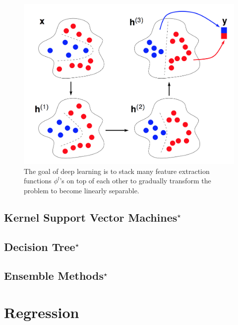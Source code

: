 \documentclass{report}
\begin{document}
\begin{figure}
    \centering
    \begin{minipage}{0.6\textwidth}
        \centering
        \includegraphics[width=\columnwidth]{figures/adaptive_basis2.png}
    \end{minipage}
    \begin{minipage}{0.39\textwidth}
        \caption{
            \label{fig:feature_extraction_deep}
            The goal of deep learning is to stack many feature extraction
            functions $\phi^l$'s on top of each other to gradually transform the
            problem to become linearly separable. 
        }
    \end{minipage}
\end{figure}



\section{Kernel Support Vector Machines$^\star$}

\section{Decision Tree$^\star$}

\section{Ensemble Methods$^\star$}


\chapter{Regression}
\label{sec:regression}
\end{document}
